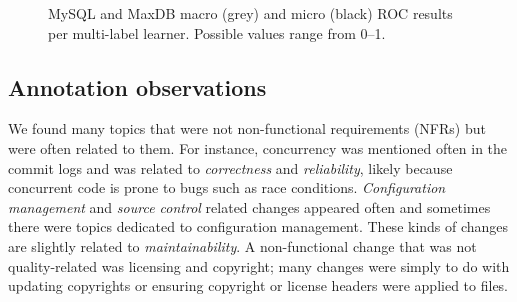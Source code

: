 \documentclass[]{sig-alternate}
\begin{document}
\begin{figure}[ht]
\centering
{}
\caption[]{MySQL and MaxDB macro (grey) and micro (black) ROC results per multi-label learner. Possible values range from 0--1.
}
\label{fig:mulan}
\end{figure}

\subsection{Annotation observations}
We found many topics that were not non-functional requirements (NFRs) but were often related to them. 
For instance, concurrency was mentioned often in the commit logs and was related to \emph{correctness} and \emph{reliability}, likely because concurrent code is prone to bugs such as race conditions.%
\emph{Configuration management} and \emph{source control} related changes appeared often and sometimes there were topics dedicated to configuration management. 
These kinds of changes are slightly related to \emph{maintainability}. 
A non-functional change that was not quality-related was licensing and copyright; many changes were simply to do with updating copyrights or ensuring copyright or license headers were applied to files.
\end{document}
